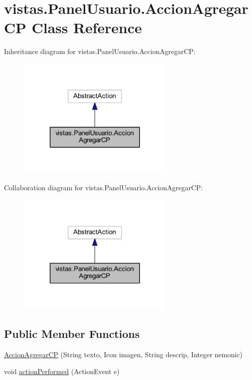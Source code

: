 \hypertarget{classvistas_1_1_panel_usuario_1_1_accion_agregar_c_p}{}\section{vistas.\+Panel\+Usuario.\+Accion\+Agregar\+CP Class Reference}
\label{classvistas_1_1_panel_usuario_1_1_accion_agregar_c_p}


Inheritance diagram for vistas.\+Panel\+Usuario.\+Accion\+Agregar\+CP\+:
\nopagebreak
\begin{figure}[H]
\begin{center}
\leavevmode
\includegraphics[width=215pt]{classvistas_1_1_panel_usuario_1_1_accion_agregar_c_p__inherit__graph}
\end{center}
\end{figure}


Collaboration diagram for vistas.\+Panel\+Usuario.\+Accion\+Agregar\+CP\+:
\nopagebreak
\begin{figure}[H]
\begin{center}
\leavevmode
\includegraphics[width=215pt]{classvistas_1_1_panel_usuario_1_1_accion_agregar_c_p__coll__graph}
\end{center}
\end{figure}
\subsection*{Public Member Functions}
\begin{DoxyCompactItemize}
\item 
\mbox{\hyperlink{classvistas_1_1_panel_usuario_1_1_accion_agregar_c_p_a1579a854e88d2de04e2b024f38e54538}{Accion\+Agregar\+CP}} (String texto, Icon imagen, String descrip, Integer nemonic)
\item 
void \mbox{\hyperlink{classvistas_1_1_panel_usuario_1_1_accion_agregar_c_p_aa549660e9be2d4a07ad4ad5d13697959}{action\+Performed}} (Action\+Event e)
\end{DoxyCompactItemize}


